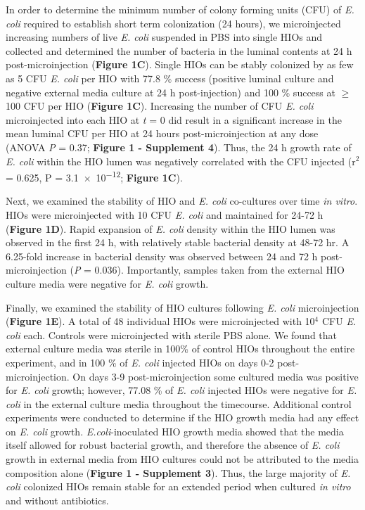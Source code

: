 \documentclass[9pt,lineo]{elife}
\begin{document}
In order to determine the minimum number of colony forming units (CFU) of \emph{E. coli} required to establish short term colonization (24 hours), we microinjected increasing numbers of live \emph{E. coli} suspended in PBS into single HIOs and collected and determined the number of bacteria in the luminal contents at 24 h post-microinjection (\textbf{Figure 1C}). Single HIOs can be stably colonized by as few as 5 CFU \emph{E. coli} per HIO with 77.8 \% success (positive luminal culture and negative external media culture at 24 h post-injection) and 100 \% success at \(\ge\) 100 CFU per HIO (\textbf{Figure 1C}).  Increasing the number of CFU \emph{E. coli} microinjected into each HIO at \emph{t} = 0 did result in a significant increase in the mean luminal CFU per HIO at 24 hours post-microinjection at any dose (ANOVA \emph{P} = 0.37; \textbf{Figure 1 - Supplement 4}). Thus, the 24 h growth rate of \emph{E. coli} within the HIO lumen was negatively correlated with the CFU injected (r\(^{\text{2}}\) = 0.625, P = \num{3.1e-12}; \textbf{Figure 1C}). 

Next, we examined the stability of HIO and \emph{E. coli} co-cultures over time \emph{in vitro}. HIOs were microinjected with 10 CFU \emph{E. coli} and maintained for 24-72 h (\textbf{Figure 1D}). Rapid expansion of \emph{E. coli} density within the HIO lumen was observed in the first 24 h, with relatively stable bacterial density at 48-72 hr. A 6.25-fold increase in bacterial density was observed between 24 and 72 h post-microinjection (\emph{P} = 0.036). Importantly, samples taken from the external HIO culture media were negative for \emph{E. coli} growth.

Finally, we examined the stability of HIO cultures following \emph{E. coli} microinjection (\textbf{Figure 1E}). A total of 48 individual HIOs were microinjected with 10\(^{\text{4}}\) CFU \emph{E. coli} each. Controls were microinjected with sterile PBS alone. We found that external culture media was sterile in 100\% of control HIOs throughout the entire experiment, and in 100 \% of \emph{E. coli} injected HIOs on days 0-2 post-microinjection. On days 3-9 post-microinjection some cultured media was positive for \emph{E. coli} growth; however, 77.08 \% of \emph{E. coli} injected HIOs were negative for \emph{E. coli} in the external culture media throughout the timecourse. Additional control experiments were conducted to determine if the HIO growth media had any effect on \emph{E. coli} growth. \emph{E.coli}-inoculated HIO growth media showed that the media itself allowed for robust bacterial growth, and therefore the absence of \emph{E. coli} growth in external media from HIO cultures could not be attributed to the media composition alone (\textbf{Figure 1 - Supplement 3}). Thus, the large majority of \emph{E. coli} colonized HIOs remain stable for an extended period when cultured \emph{in vitro} and without antibiotics.
\end{document}
